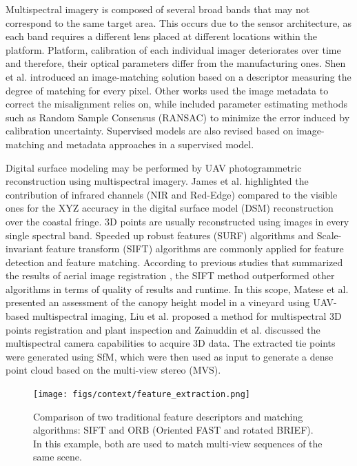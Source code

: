 Multispectral imagery is composed of several broad bands that may not correspond to the same target area. This occurs due to the sensor architecture, as each band requires a different lens placed at different locations within the platform. Platform, calibration of each individual imager deteriorates over time and therefore, their optical parameters differ from the manufacturing ones. Shen et al. \cite{shen_multi-modal_2014} introduced an image-matching solution based on a descriptor measuring the degree of matching for every pixel. Other works used the image metadata to correct the misalignment \cite{jhan_band--band_2016, jhan_investigation_2017} relies on, while \cite{jhan_investigation_2017} included parameter estimating methods such as Random Sample Consensus (RANSAC) to minimize the error induced by calibration uncertainty. Supervised models are also revised based on image-matching and metadata approaches in a supervised model.

Digital surface modeling may be performed by UAV photogrammetric reconstruction using multispectral imagery. James et al. \cite{james_uav_2021} highlighted the contribution of infrared channels (NIR and Red-Edge) compared to the visible ones for the XYZ accuracy in the digital surface model (DSM) reconstruction over the coastal fringe. 3D points are usually reconstructed using images in every single spectral band. Speeded up robust features (SURF) algorithms \cite{sedaghat_high-resolution_2019} and Scale-invariant feature transform (SIFT) algorithms \cite{saleem_robust_2014} are commonly applied for feature detection and feature matching. According to previous studies that summarized the results of aerial image registration \cite{tsai_accelerated_2017}, the SIFT method outperformed other algorithms in terms of quality of results and runtime. In this scope, Matese et al. \cite{matese_assessment_2017} presented an assessment of the canopy height model in a vineyard using UAV-based multispectral imaging, Liu et al. \cite{liu_registration_2018} proposed a method for multispectral 3D points registration and plant inspection and Zainuddin et al. \cite{zainuddin_3d_2019} discussed the multispectral camera capabilities to acquire 3D data. The extracted tie points were generated using SfM, which were then used as input to generate a dense point cloud based on the multi-view stereo (MVS). 

\begin{figure}[!ht]
	\texttt{[image: figs/context/feature\_extraction.png]}
	\caption{Comparison of two traditional feature descriptors and matching algorithms: SIFT and ORB (Oriented FAST and rotated BRIEF). In this example, both are used to match multi-view sequences of the same scene.}
    \label{fig:feature_descriptors}
\end{figure}

